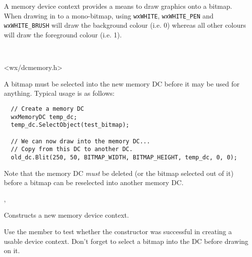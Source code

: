 \section{}\label{wxmemorydc}

A memory device context provides a means to draw graphics onto a bitmap. When
drawing in to a mono-bitmap, using {\tt wxWHITE}, {\tt wxWHITE\_PEN} and
{\tt wxWHITE\_BRUSH}
will draw the background colour (i.e. 0) whereas all other colours will draw the
foreground colour (i.e. 1).


\\


<wx/dcmemory.h>




A bitmap must be selected into the new memory DC before it may be used
for anything.  Typical usage is as follows:

\begin{verbatim}
  // Create a memory DC
  wxMemoryDC temp_dc;
  temp_dc.SelectObject(test_bitmap);

  // We can now draw into the memory DC...
  // Copy from this DC to another DC.
  old_dc.Blit(250, 50, BITMAP_WIDTH, BITMAP_HEIGHT, temp_dc, 0, 0);
\end{verbatim}

Note that the memory DC {\it must} be deleted (or the bitmap selected out of it) before a bitmap
can be reselected into another memory DC.


, 


\label{wxmemorydcctor}


Constructs a new memory device context.

Use the  member to test whether the constructor was successful
in creating a usable device context.
Don't forget to select a bitmap into the DC before drawing on it.


